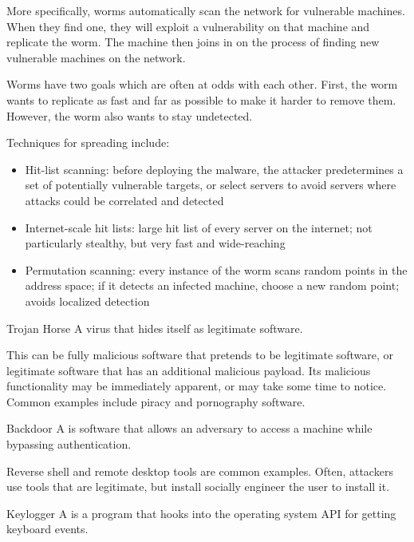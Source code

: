 \documentclass[code]{amznotes}
\begin{document}
More specifically, worms automatically scan the network for vulnerable machines. When they find one, they will exploit a vulnerability on that machine and replicate the worm. The machine then joins in on the process of finding new vulnerable machines on the network.

Worms have two goals which are often at odds with each other. First, the worm wants to replicate as fast and far as possible to make it harder to remove them. However, the worm also wants to stay undetected.

Techniques for spreading include:
\begin{itemize}
    \item Hit-list scanning: before deploying the malware, the attacker predetermines a set of potentially vulnerable targets, or select servers to avoid servers where attacks could be correlated and detected
    \item Internet-scale hit lists: large hit list of every server on the internet; not particularly stealthy, but very fast and wide-reaching
    \item Permutation scanning: every instance of the worm scans random points in the address space; if it detects an infected machine, choose a new random point; avoids localized detection
\end{itemize}

\begin{dfnbox}{Trojan Horse}{}
    A virus that hides itself as legitimate software.
\end{dfnbox}

This can be fully malicious software that pretends to be legitimate software, or legitimate software that has an additional malicious payload. Its malicious functionality may be immediately apparent, or may take some time to notice. Common examples include piracy and pornography software.

\begin{dfnbox}{Backdoor}{}
    A  is software that allows an adversary to access a machine while bypassing authentication.
\end{dfnbox}

Reverse shell and remote desktop tools are common examples. Often, attackers use tools that are legitimate, but install socially engineer the user to install it.

\begin{dfnbox}{Keylogger}{}
    A  is a program that hooks into the operating system API for getting keyboard events.
\end{dfnbox}
\end{document}
